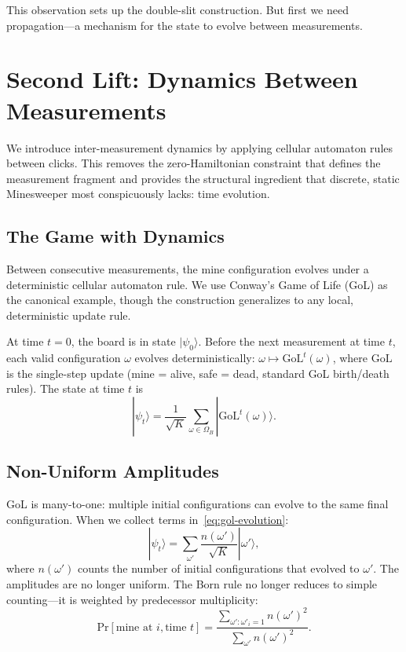 \documentclass[12pt,a4paper]{article}
\theoremstyle{definition}
\theoremstyle{remark}
\newcommand{\Conf}{\Omega}
\newcommand{\ket}[1]{|#1\rangle}
\newcommand{\Prob}{\mathrm{Pr}}
\newcommand{\GoL}{\mathrm{GoL}}
\begin{document}
This observation sets up the double-slit construction.  But first we need propagation---a mechanism for the state to evolve between measurements.


\section{Second Lift: Dynamics Between Measurements}
\label{sec:dynamics}

We introduce inter-measurement dynamics by applying cellular automaton rules between clicks.  This removes the zero-Hamiltonian constraint that defines the measurement fragment and provides the structural ingredient that discrete, static Minesweeper most conspicuously lacks: time evolution.

\subsection{The Game with Dynamics}

Between consecutive measurements, the mine configuration evolves under a deterministic cellular automaton rule.  We use Conway's Game of Life (GoL) as the canonical example, though the construction generalizes to any local, deterministic update rule.

At time $t = 0$, the board is in state $\ket{\psi_0}$.  Before the next measurement at time $t$, each valid configuration $\omega$ evolves deterministically: $\omega \mapsto \GoL^t(\omega)$, where $\GoL$ is the single-step update (mine = alive, safe = dead, standard GoL birth/death rules).  The state at time $t$ is
\begin{equation}\label{eq:gol-evolution}
  \ket{\psi_t} = \frac{1}{\sqrt{K}} \sum_{\omega \in \Conf_B} \ket{\GoL^t(\omega)}.
\end{equation}

\subsection{Non-Uniform Amplitudes}

GoL is many-to-one: multiple initial configurations can evolve to the same final configuration.  When we collect terms in~\eqref{eq:gol-evolution}:
\begin{equation}\label{eq:nonuniform}
  \ket{\psi_t} = \sum_{\omega'} \frac{n(\omega')}{\sqrt{K}} \ket{\omega'},
\end{equation}
where $n(\omega')$ counts the number of initial configurations that evolved to $\omega'$.  The amplitudes are no longer uniform.  The Born rule no longer reduces to simple counting---it is weighted by predecessor multiplicity:
\begin{equation}\label{eq:gol-born}
  \Prob[\text{mine at } i, \text{time } t] = \frac{\sum_{\omega': \omega'_i = 1} n(\omega')^2}{\sum_{\omega'} n(\omega')^2}.
\end{equation}
\end{document}
